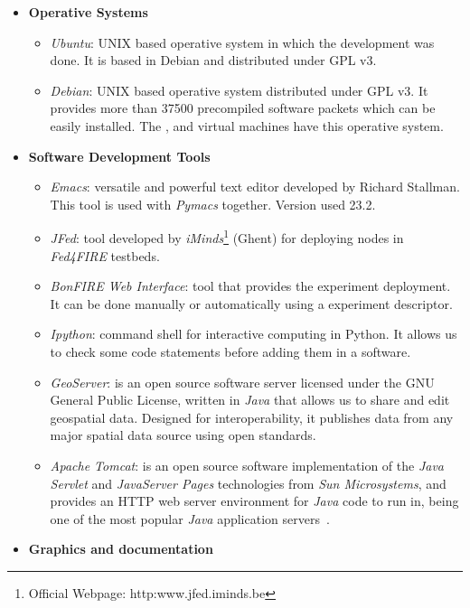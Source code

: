 \begin{itemize}
\item \textbf{Operative Systems}
\begin{itemize}
\item{\emph{Ubuntu}}: UNIX based operative system in which the development was done. It
  is based in Debian and distributed under \ac{GPL} v3.
\item{\emph{Debian}}: UNIX based operative system distributed under \ac{GPL}
  v3. It provides more than 37500 precompiled software packets which can be
  easily installed. The \bonfire, \vw and \pl virtual machines have this operative system.
\end{itemize}


\item \textbf{Software Development Tools}

\begin{itemize}
\item{\emph{Emacs}}: versatile and powerful text editor developed by Richard
  Stallman. This tool is used with \emph{Pymacs} together. Version used 23.2.
\item{\emph{JFed}}: tool developed by \emph{iMinds}\footnote{Official Webpage:
  http:www.jfed.iminds.be} (Ghent) for deploying nodes in
  \emph{Fed4FIRE} testbeds. 
\item{\emph{BonFIRE Web Interface}}: \bonfire tool that provides the experiment
  deployment. It can be done manually or automatically using a experiment descriptor.
\item \emph{Ipython}:  command shell for interactive computing in Python. It
  allows us to check some code statements before adding them in a software.
\item \emph{GeoServer}: is an open source software server licensed under the
  \ac{GNU} General Public License, written in \emph{Java} that allows us to
  share and edit geospatial data. Designed for interoperability, it publishes
  data from any major spatial data source using open standards.
\item \emph{Apache Tomcat}:  is an open source software implementation of the \emph{Java Servlet} and \emph{JavaServer Pages} technologies from \emph{Sun Microsystems}, and provides an \ac{HTTP} web server environment for \emph{Java} code to run in, being one of the most popular \emph{Java} application servers~\cite{Foundation2014b}.
\end{itemize}


\item \textbf{Graphics and documentation}


\end{itemize}
